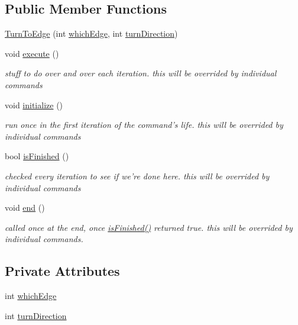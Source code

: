 \subsection*{Public Member Functions}
\begin{DoxyCompactItemize}
\item 
\hyperlink{classTurnToEdge_ae426a19ff06e0b402dcbb5cfbb2d178f}{Turn\-To\-Edge} (int \hyperlink{classTurnToEdge_a2a5053fc4cc07dd36874e327d4790a72}{which\-Edge}, int \hyperlink{classTurnToEdge_aebef6e8ce9b5c39f21bd065f1c474aab}{turn\-Direction})
\item 
void \hyperlink{classTurnToEdge_a74715c9f813240b7280fef04277ab890}{execute} ()
\begin{DoxyCompactList}\small\item\em stuff to do over and over each iteration. this will be overrided by individual commands \end{DoxyCompactList}\item 
void \hyperlink{classTurnToEdge_a9cad8754ff556ad6b10eef959ec701d5}{initialize} ()
\begin{DoxyCompactList}\small\item\em run once in the first iteration of the command's life. this will be overrided by individual commands \end{DoxyCompactList}\item 
bool \hyperlink{classTurnToEdge_a6ebfe539f6800404da5c6a69c578f30d}{is\-Finished} ()
\begin{DoxyCompactList}\small\item\em checked every iteration to see if we're done here. this will be overrided by individual commands \end{DoxyCompactList}\item 
void \hyperlink{classTurnToEdge_a5a7467ec0d1775fa2c78e751ddc4f0a9}{end} ()
\begin{DoxyCompactList}\small\item\em called once at the end, once \hyperlink{classTurnToEdge_a6ebfe539f6800404da5c6a69c578f30d}{is\-Finished()} returned true. this will be overrided by individual commands. \end{DoxyCompactList}\end{DoxyCompactItemize}
\subsection*{Private Attributes}
\begin{DoxyCompactItemize}
\item 
int \hyperlink{classTurnToEdge_a2a5053fc4cc07dd36874e327d4790a72}{which\-Edge}
\item 
int \hyperlink{classTurnToEdge_aebef6e8ce9b5c39f21bd065f1c474aab}{turn\-Direction}
\end{DoxyCompactItemize}
